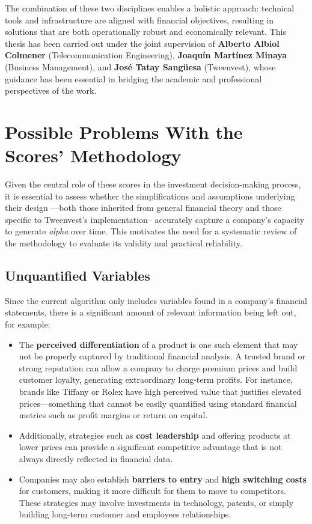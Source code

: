 \documentclass[11pt,english,a4paper,hidelinks]{book}
\begin{document}
\vspace{0.5cm}
\noindent The combination of these two disciplines enables a holistic approach: technical tools and infrastructure are aligned with financial objectives, resulting in solutions that are both operationally robust and economically relevant. This thesis has been carried out under the joint supervision of \textbf{Alberto Albiol Colmener} (Telecommunication Engineering), \textbf{Joaquín Martínez Minaya} (Business Management), and \textbf{José Tatay Sangüesa} (Tweenvest), whose guidance has been essential in bridging the academic and professional perspectives of the work.

\section{Possible Problems With the Scores' Methodology}

\noindent Given the central role of these scores in the investment decision-making process, it is essential to assess whether the simplifications and assumptions underlying their design —both those inherited from general financial theory and those specific to Tweenvest’s implementation-- accurately capture a company’s capacity to generate \textit{alpha} over time. This motivates the need for a systematic review of the methodology to evaluate its validity and practical reliability.


\subsection{Unquantified Variables}
\noindent Since the current algorithm only includes variables found in a company's financial statements, there is a significant amount of relevant information being left out, for example:

\begin{itemize}
    \item The \textbf{perceived differentiation} of a product is one such element that may not be properly captured by traditional financial analysis. A trusted brand or strong reputation can allow a company to charge premium prices and build customer loyalty, generating extraordinary long-term profits. For instance, brands like Tiffany or Rolex have high perceived value that justifies elevated prices—something that cannot be easily quantified using standard financial metrics such as profit margins or return on capital.

    \item Additionally, strategies such as \textbf{cost leadership} and offering products at lower prices can provide a significant competitive advantage that is not always directly reflected in financial data.

    \item Companies may also establish \textbf{barriers to entry} and \textbf{high switching costs} for customers, making it more difficult for them to move to competitors. These strategies may involve investments in technology, patents, or simply building long-term customer and employees relationships.
\end{itemize}
\end{document}

